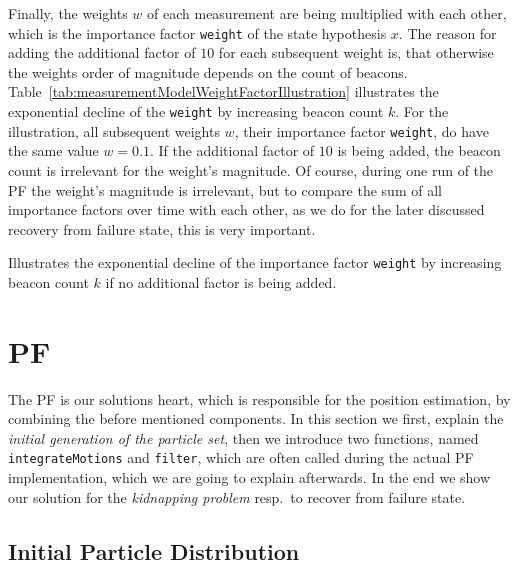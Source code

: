Finally, the weights $w$ of each measurement are being multiplied with each other, which is the importance factor \texttt{weight} of the state hypothesis $x$. The reason for adding the additional factor of $10$ for each subsequent weight is, that otherwise the weights order of magnitude depends on the count of beacons. Table~\ref{tab:measurementModelWeightFactorIllustration} illustrates the exponential decline of the \texttt{weight} by increasing beacon count $k$. For the illustration, all subsequent weights $w$, their importance factor \texttt{weight}, do have the same value  $w = 0.1$. If the additional factor of $10$ is being added, the beacon count is irrelevant for the weight's magnitude. Of course, during one run of the \acl{PF} the weight's magnitude is irrelevant, but to compare the sum of all importance factors over time with each other, as we do for the later discussed recovery from failure state, this is very important.

\begin{table}
	
	\caption{Illustrates the exponential decline of the importance factor \texttt{weight} by increasing beacon count $k$ if no additional factor is being added.}
	\label{tab:measurementModelWeightFactorIllustration}
\end{table}


\section{\acl{PF}}
The \acl{PF} is our solutions heart, which is responsible for the position estimation, by combining the before mentioned components. In this section we first, explain the \emph{initial generation of the particle set}, then we introduce two functions, named \texttt{integrateMotions} and \texttt{filter}, which are often called during the actual \acs{PF} implementation, which we are going to explain afterwards. In the end we show our solution for the \emph{kidnapping problem} resp.\ to recover from failure state.


\subsection{Initial Particle Distribution}\label{sec:algo_initial}

